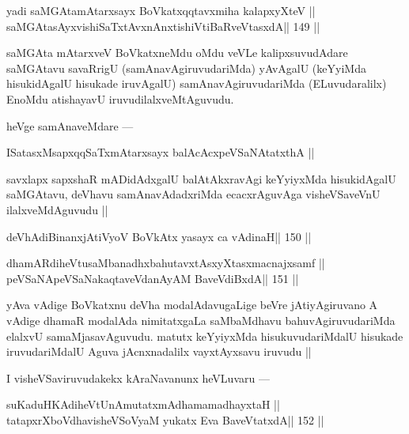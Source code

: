 \begin{shl}
yadi saMGAtamAtarxsayx BoVkatxqqtavxmiha kalapxyXteV ||
saMGAtasAyxvishiSaTxtAvxnAnxtishiVtiBaRveVtasxdA\hfill || 149 ||
\end{shl}

\begin{artha}
saMGAta mAtarxveV BoVkatxneMdu oMdu veVLe kalipxsuvudAdare saMGAtavu 
savaRrigU (samAnavAgiruvudariMda) yAvAgalU (keYyiMda hisukidAgalU 
hisukade iruvAgalU) samAnavAgiruvudariMda (ELuvudaralilx) EnoMdu 
atishayavU iruvudilalxveMtAguvudu.
\end{artha}

\begin{artha}
heVge samAnaveMdare ---
\end{artha}

\begin{shl}
ISatasxMsapxqqSaTxmAtarxsayx balAcAcx\s\s peVSaNAtatxthA ||
\end{shl}

\begin{artha}
savxlapx sapxshaR mADidAdxgalU balAtAkxravAgi keYyiyxMda hisukidAgalU 
saMGAtavu, deVhavu samAnavAdadxriMda ecacxrAguvAga visheVSaveVnU ilalxveMdAguvudu ||
\end{artha}

\begin{shl}
deVhAdiBinanxjAtiVyoV BoVkAtx yasayx ca vAdinaH\hfill || 150 ||
\end{shl}

\begin{shl}
dhamARdiheVtusaMbanadhxbahutavxtAsxyXtasxmacnajxsamf ||
peVSaNApeVSaNakaqtaveVdanAyAM BaveVdiBxdA\hfill || 151 ||
\end{shl}

\begin{artha}
yAva vAdige BoVkatxnu deVha modalAdavugaLige beVre jAtiyAgiruvano A 
vAdige dhamaR modalAda nimitatxgaLa saMbaMdhavu bahuvAgiruvudariMda 
elalxvU samaMjasavAguvudu. matutx keYyiyxMda hisukuvudariMdalU  
hisukade iruvudariMdalU Aguva jAcnxnadalilx vayxtAyxsavu iruvudu ||
\end{artha}

\begin{artha}
I visheVSaviruvudakekx kAraNavanunx heVLuvaru ---
\end{artha}

\begin{shl}
suKaduHKAdiheVtUnAmutatxmAdhamamadhayxtaH ||
tatapxrXboVdhavisheVSoV\s yaM yukatx Eva BaveVtatxdA\hfill || 152 ||
\end{shl}

